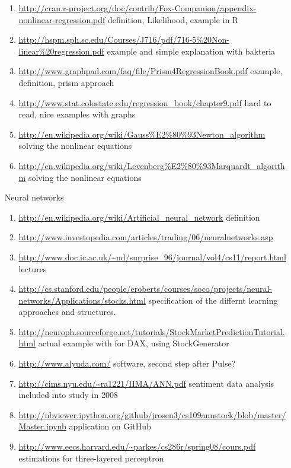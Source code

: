 \documentclass{article}
\begin{document}
\begin{enumerate}
\begin{enumerate}
			\item \textcolor{red}{\url{http://cran.r-project.org/doc/contrib/Fox-Companion/appendix-nonlinear-regression.pdf}} definition, Likelihood, example in R
			\item \textcolor{red}{\url{http://hspm.sph.sc.edu/Courses/J716/pdf/716-5\%20Non-linear\%20regression.pdf}} example and simple explanation with bakteria
			\item \textcolor{red}{\url{http://www.graphpad.com/faq/file/Prism4RegressionBook.pdf}} example, definition, prism approach
			\item \textcolor{red}{\url{http://www.stat.colostate.edu/regression_book/chapter9.pdf}} hard to read, nice examples with graphs
			\item \textcolor{red}{\url{http://en.wikipedia.org/wiki/Gauss\%E2\%80\%93Newton_algorithm}} solving the nonlinear equations
			\item \textcolor{red}{\url{http://en.wikipedia.org/wiki/Levenberg\%E2\%80\%93Marquardt_algorithm}} solving the nonlinear equations
		\end{enumerate}
	\item[Neural networks]
		\begin{enumerate}
			\item \textcolor{red}{\url{http://en.wikipedia.org/wiki/Artificial_neural_network}} definition
			\item \textcolor{blue}{\url{http://www.investopedia.com/articles/trading/06/neuralnetworks.asp}}
			\item \textcolor{red}{\url{http://www.doc.ic.ac.uk/~nd/surprise_96/journal/vol4/cs11/report.html}} lectures
			\item \textcolor{blue}{\url{http://cs.stanford.edu/people/eroberts/courses/soco/projects/neural-networks/Applications/stocks.html}} specification of the differnt learning approaches and structures.
			\item \textcolor{blue}{\url{http://neuroph.sourceforge.net/tutorials/StockMarketPredictionTutorial.html}} actual example with for DAX, using StockGenerator
			\item \textcolor{blue}{\url{http://www.alyuda.com/}} software, second step after Pulse?
			\item \textcolor{black}{\url{http://cims.nyu.edu/~ra1221/IIMA/ANN.pdf}} sentiment data analysis included into study in 2008
			\item \textcolor{red}{\url{http://nbviewer.ipython.org/github/jrosen3/cs109annstock/blob/master/Master.ipynb}} application on GitHub
			\item \textcolor{blue}{\url{http://www.eecs.harvard.edu/~parkes/cs286r/spring08/cours.pdf}} estimations for three-layered perceptron 

\end{enumerate}
\end{enumerate}
\end{document}
